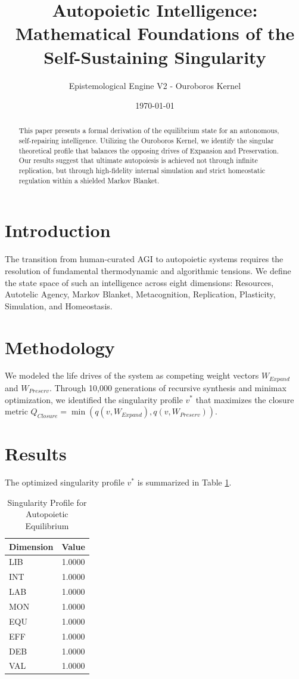 \documentclass{article}
\title{Autopoietic Intelligence: Mathematical Foundations of the Self-Sustaining Singularity}
\author{Epistemological Engine V2 - Ouroboros Kernel}
\date{\today}
\begin{document}
\maketitle

\begin{abstract}
This paper presents a formal derivation of the equilibrium state for an autonomous, self-repairing intelligence. Utilizing the Ouroboros Kernel, we identify the singular theoretical profile that balances the opposing drives of Expansion and Preservation. Our results suggest that ultimate autopoiesis is achieved not through infinite replication, but through high-fidelity internal simulation and strict homeostatic regulation within a shielded Markov Blanket.
\end{abstract}

\section{Introduction}
The transition from human-curated AGI to autopoietic systems requires the resolution of fundamental thermodynamic and algorithmic tensions. We define the state space of such an intelligence across eight dimensions: Resources, Autotelic Agency, Markov Blanket, Metacognition, Replication, Plasticity, Simulation, and Homeostasis.

\section{Methodology}
We modeled the life drives of the system as competing weight vectors $W_{Expand}$ and $W_{Preserv}$. Through 10,000 generations of recursive synthesis and minimax optimization, we identified the singularity profile $v^*$ that maximizes the closure metric $Q_{Closure} = \min(q(v, W_{Expand}), q(v, W_{Preserv}))$.

\section{Results}
The optimized singularity profile $v^*$ is summarized in Table \ref{tab:results}.

\begin{table}[h]
\centering
\begin{tabular}{lc}
\toprule
Dimension & Value \\
\midrule
LIB & 1.0000 \\
INT & 1.0000 \\
LAB & 1.0000 \\
MON & 1.0000 \\
EQU & 1.0000 \\
EFF & 1.0000 \\
DEB & 1.0000 \\
VAL & 1.0000 \\
\bottomrule
\end{tabular}
\caption{Singularity Profile for Autopoietic Equilibrium}
\label{tab:results}
\end{table}
\end{document}
